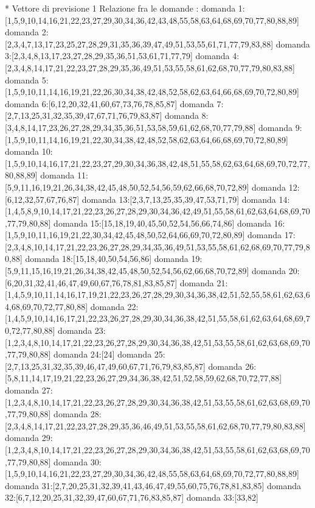* Vettore di previsione 1
Relazione fra le domande :
domanda 1:[1,5,9,10,14,16,21,22,23,27,29,30,34,36,42,43,48,55,58,63,64,68,69,70,77,80,88,89]
domanda 2:[2,3,4,7,13,17,23,25,27,28,29,31,35,36,39,47,49,51,53,55,61,71,77,79,83,88]
domanda 3:[2,3,4,8,13,17,23,27,28,29,35,36,51,53,61,71,77,79]
domanda 4:[2,3,4,8,14,17,21,22,23,27,28,29,35,36,49,51,53,55,58,61,62,68,70,77,79,80,83,88]
domanda 5:[1,5,9,10,11,14,16,19,21,22,26,30,34,38,42,48,52,58,62,63,64,66,68,69,70,72,80,89]
domanda 6:[6,12,20,32,41,60,67,73,76,78,85,87]
domanda 7:[2,7,13,25,31,32,35,39,47,67,71,76,79,83,87]
domanda 8:[3,4,8,14,17,23,26,27,28,29,34,35,36,51,53,58,59,61,62,68,70,77,79,88]
domanda 9:[1,5,9,10,11,14,16,19,21,22,30,34,38,42,48,52,58,62,63,64,66,68,69,70,72,80,89]
domanda 10:[1,5,9,10,14,16,17,21,22,23,27,29,30,34,36,38,42,48,51,55,58,62,63,64,68,69,70,72,77,80,88,89]
domanda 11:[5,9,11,16,19,21,26,34,38,42,45,48,50,52,54,56,59,62,66,68,70,72,89]
domanda 12:[6,12,32,57,67,76,87]
domanda 13:[2,3,7,13,25,35,39,47,53,71,79]
domanda 14:[1,4,5,8,9,10,14,17,21,22,23,26,27,28,29,30,34,36,42,49,51,55,58,61,62,63,64,68,69,70,77,79,80,88]
domanda 15:[15,18,19,40,45,50,52,54,56,66,74,86]
domanda 16:[1,5,9,10,11,16,19,21,22,30,34,42,45,48,50,52,64,66,69,70,72,80,89]
domanda 17:[2,3,4,8,10,14,17,21,22,23,26,27,28,29,34,35,36,49,51,53,55,58,61,62,68,69,70,77,79,80,88]
domanda 18:[15,18,40,50,54,56,86]
domanda 19:[5,9,11,15,16,19,21,26,34,38,42,45,48,50,52,54,56,62,66,68,70,72,89]
domanda 20:[6,20,31,32,41,46,47,49,60,67,76,78,81,83,85,87]
domanda 21:[1,4,5,9,10,11,14,16,17,19,21,22,23,26,27,28,29,30,34,36,38,42,51,52,55,58,61,62,63,64,68,69,70,72,77,80,88]
domanda 22:[1,4,5,9,10,14,16,17,21,22,23,26,27,28,29,30,34,36,38,42,51,55,58,61,62,63,64,68,69,70,72,77,80,88]
domanda 23:[1,2,3,4,8,10,14,17,21,22,23,26,27,28,29,30,34,36,38,42,51,53,55,58,61,62,63,68,69,70,77,79,80,88]
domanda 24:[24]
domanda 25:[2,7,13,25,31,32,35,39,46,47,49,60,67,71,76,79,83,85,87]
domanda 26:[5,8,11,14,17,19,21,22,23,26,27,29,34,36,38,42,51,52,58,59,62,68,70,72,77,88]
domanda 27:[1,2,3,4,8,10,14,17,21,22,23,26,27,28,29,30,34,36,38,42,51,53,55,58,61,62,63,68,69,70,77,79,80,88]
domanda 28:[2,3,4,8,14,17,21,22,23,27,28,29,35,36,46,49,51,53,55,58,61,62,68,70,77,79,80,83,88]
domanda 29:[1,2,3,4,8,10,14,17,21,22,23,26,27,28,29,30,34,36,38,42,51,53,55,58,61,62,63,68,69,70,77,79,80,88]
domanda 30:[1,5,9,10,14,16,21,22,23,27,29,30,34,36,42,48,55,58,63,64,68,69,70,72,77,80,88,89]
domanda 31:[2,7,20,25,31,32,39,41,43,46,47,49,55,60,75,76,78,81,83,85]
domanda 32:[6,7,12,20,25,31,32,39,47,60,67,71,76,83,85,87]
domanda 33:[33,82]
